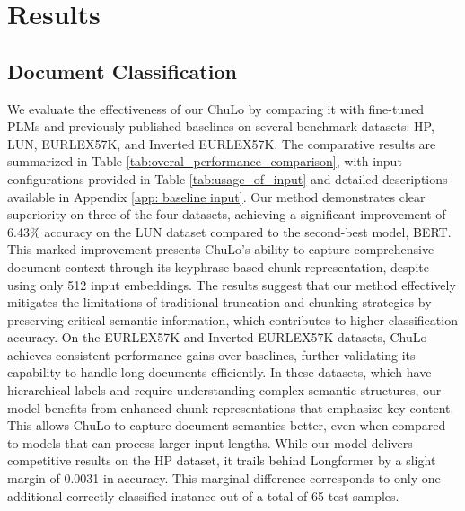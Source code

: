 \documentclass[11pt]{article}
\begin{document}
\section{Results}
\subsection{Document Classification}
We evaluate the effectiveness of our ChuLo by comparing it with fine-tuned PLMs and previously published baselines \citep{park2022efficient, jaiswal2023breaking} on several benchmark datasets: HP, LUN, EURLEX57K, and Inverted EURLEX57K. The comparative results are summarized in Table \ref{tab:overal_performance_comparison}, with input configurations provided in Table \ref{tab:usage_of_input} and detailed descriptions available in Appendix \ref{app: baseline input}. 
Our method demonstrates clear superiority on three of the four datasets, achieving a significant improvement of 6.43\% accuracy on the LUN dataset compared to the second-best model, BERT. This marked improvement presents ChuLo’s ability to capture comprehensive document context through its keyphrase-based chunk representation, despite using only 512 input embeddings. The results suggest that our method effectively mitigates the limitations of traditional truncation and chunking strategies by preserving critical semantic information, which contributes to higher classification accuracy. On the EURLEX57K and Inverted EURLEX57K datasets, ChuLo achieves consistent performance gains over baselines, further validating its capability to handle long documents efficiently. In these datasets, which have hierarchical labels and require understanding complex semantic structures, our model benefits from enhanced chunk representations that emphasize key content. This allows ChuLo to capture document semantics better, even when compared to models that can process larger input lengths.
While our model delivers competitive results on the HP dataset, it trails behind Longformer by a slight margin of 0.0031 in accuracy. This marginal difference corresponds to only one additional correctly classified instance out of a total of 65 test samples. 
\end{document}
